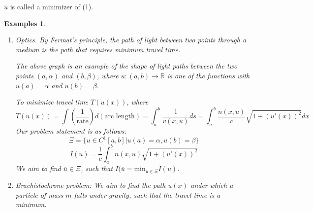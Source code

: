\documentclass[12pt]{report}
\newtheorem{examples}{Examples}[section]
\begin{document}
\(\overline{u}\) is called a minimizer of  (1). 
\begin{examples}
\begin{enumerate}
    \item Optics. By Fermat's principle, the path of light between two points through a medium is the path that requires minimum travel time. 
\begin{center}
\end{center}
The above graph is an example of the shape of light paths between the two points \((a, \alpha)\) and \((b, \beta)\), where \(u: (a,b) \to \mathbb{R}\) is one of the functions with \(u(a) = \alpha\) and \(u(b) = \beta\). 

To minimize travel time \(T(u(x))\), where 
\begin{equation}
T(u(x)) = \int (\frac{1}{\text{rate}}) d (\text{arc length}) = \int_a^b \frac{1}{v(x, u)} ds = \int_a^b \frac{n(x, u)}{c} \sqrt{1+(u'(x))^2} dx \tag{2}
\end{equation}
Our problem statement is as follows:
\[\Xi = \{u \in C^1[a, b]|u(a) = \alpha, u(b) = \beta\}\]
\[I(u) = \frac{1}{c} \int_a^b n(x, u) \sqrt{1+(u'(x))^2}\]
We aim to find \(\overline{u} \in \Xi\), such that \(I(\overline{u} = \text{min}_{u \in \Xi} I(u)\). 

\item Brachistochrone problem: We aim to find the path \(u(x)\) under which a particle of mass \(m\) falls under gravity, such that the travel time is a minimum. 
\begin{center}
\end{center}
\end{enumerate}
\end{examples}
\end{document}
